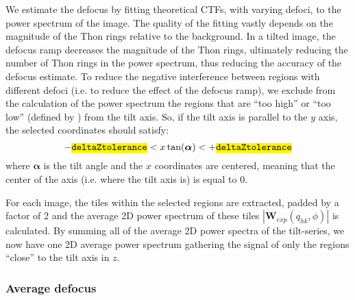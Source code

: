 We estimate the defocus by fitting theoretical CTFs, with varying defoci, to the power spectrum of the image. The quality of the fitting vastly depends on the magnitude of the Thon rings relative to the background. In a tilted image, the defocus ramp decreases the magnitude of the Thon rings, ultimately reducing the number of Thon rings in the power spectrum, thus reducing the accuracy of the defocus estimate. To reduce the negative interference between regions with different defoci (i.e. to reduce the effect of the defocus ramp), we exclude from the calculation of the power spectrum the regions that are ``too high'' or ``too low'' (defined by ) from the tilt axis. So, if the tilt axis is parallel to the $y$ axis, the selected coordinates should satisfy:
\begin{equation}
    -\code{deltaZtolerance} < x \tan(\bm{\alpha}) < +\code{deltaZtolerance}
\end{equation} %
where $\bm{\alpha}$ is the tilt angle and the $x$ coordinates are centered, meaning that the center of the axis (i.e. where the tilt axis is) is equal to $0$.
    
For each image, the tiles within the selected regions are extracted, padded by a factor of 2 and the average 2D power spectrum of these tiles $|\bm{W}_{exp}(q_{hk},\phi)|$ is calculated. By summing all of the average 2D power spectra of the tilt-series, we now have one 2D average power spectrum gathering the signal of only the regions ``close'' to the tilt axis in $z$.

\subsubsection{Average defocus} \label{sec:algo:defocus_estimate:avg_defocus}


